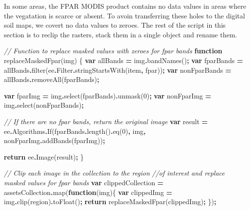 \documentclass[
  10pt,
  b5paper,
  oneside]{book}
\newenvironment{Shaded}{\begin{snugshade}}{\end{snugshade}}
\newcommand{\AttributeTok}[1]{\textcolor[rgb]{0.77,0.63,0.00}{#1}}
\newcommand{\CommentTok}[1]{\textcolor[rgb]{0.56,0.35,0.01}{\textit{#1}}}
\newcommand{\ControlFlowTok}[1]{\textcolor[rgb]{0.13,0.29,0.53}{\textbf{#1}}}
\newcommand{\DecValTok}[1]{\textcolor[rgb]{0.00,0.00,0.81}{#1}}
\newcommand{\FunctionTok}[1]{\textcolor[rgb]{0.00,0.00,0.00}{#1}}
\newcommand{\KeywordTok}[1]{\textcolor[rgb]{0.13,0.29,0.53}{\textbf{#1}}}
\newcommand{\NormalTok}[1]{#1}
\newcommand{\OperatorTok}[1]{\textcolor[rgb]{0.81,0.36,0.00}{\textbf{#1}}}
\newcommand{\StringTok}[1]{\textcolor[rgb]{0.31,0.60,0.02}{#1}}
\begin{document}
In some areas, the FPAR MODIS product contains no data values in areas where the vegatation is scarce or absent. To avoin transferring these holes to the digital soil maps, we covert no data values to zeroes.
The rest of the script in this section is to reclip the rasters, stack them in a single object and rename them.

\begin{Shaded}
\begin{Highlighting}[]
\CommentTok{// Function to replace masked values with zeroes for fpar bands}
\KeywordTok{function} \FunctionTok{replaceMaskedFpar}\NormalTok{(img) \{}
  \KeywordTok{var}\NormalTok{ allBands }\OperatorTok{=}\NormalTok{ img}\OperatorTok{.}\FunctionTok{bandNames}\NormalTok{()}\OperatorTok{;}
  \KeywordTok{var}\NormalTok{ fparBands }\OperatorTok{=} 
\NormalTok{  allBands}\OperatorTok{.}\FunctionTok{filter}\NormalTok{(ee}\OperatorTok{.}\AttributeTok{Filter}\OperatorTok{.}\FunctionTok{stringStartsWith}\NormalTok{(}\StringTok{\textquotesingle{}item\textquotesingle{}}\OperatorTok{,} \StringTok{\textquotesingle{}fpar\textquotesingle{}}\NormalTok{))}\OperatorTok{;}
  \KeywordTok{var}\NormalTok{ nonFparBands }\OperatorTok{=}\NormalTok{ allBands}\OperatorTok{.}\FunctionTok{removeAll}\NormalTok{(fparBands)}\OperatorTok{;}
  
  \KeywordTok{var}\NormalTok{ fparImg }\OperatorTok{=}\NormalTok{ img}\OperatorTok{.}\FunctionTok{select}\NormalTok{(fparBands)}\OperatorTok{.}\FunctionTok{unmask}\NormalTok{(}\DecValTok{0}\NormalTok{)}\OperatorTok{;}
  \KeywordTok{var}\NormalTok{ nonFparImg }\OperatorTok{=}\NormalTok{ img}\OperatorTok{.}\FunctionTok{select}\NormalTok{(nonFparBands)}\OperatorTok{;}
  
  \CommentTok{// If there are no fpar bands, return the original image}
  \KeywordTok{var}\NormalTok{ result }\OperatorTok{=}\NormalTok{ ee}\OperatorTok{.}\AttributeTok{Algorithms}\OperatorTok{.}\FunctionTok{If}\NormalTok{(fparBands}\OperatorTok{.}\FunctionTok{length}\NormalTok{()}\OperatorTok{.}\FunctionTok{eq}\NormalTok{(}\DecValTok{0}\NormalTok{)}\OperatorTok{,}
\NormalTok{                                 img}\OperatorTok{,}
\NormalTok{                                 nonFparImg}\OperatorTok{.}\FunctionTok{addBands}\NormalTok{(fparImg))}\OperatorTok{;}
  
  \ControlFlowTok{return}\NormalTok{ ee}\OperatorTok{.}\FunctionTok{Image}\NormalTok{(result)}\OperatorTok{;}
\NormalTok{\}}

\CommentTok{// Clip each image in the collection to the region }
\CommentTok{//of interest and replace masked values for fpar bands}
\KeywordTok{var}\NormalTok{ clippedCollection }\OperatorTok{=}\NormalTok{ assetsCollection}\OperatorTok{.}\FunctionTok{map}\NormalTok{(}\KeywordTok{function}\NormalTok{(img)\{}
  \KeywordTok{var}\NormalTok{ clippedImg }\OperatorTok{=}\NormalTok{ img}\OperatorTok{.}\FunctionTok{clip}\NormalTok{(region)}\OperatorTok{.}\FunctionTok{toFloat}\NormalTok{()}\OperatorTok{;}
  \ControlFlowTok{return} \FunctionTok{replaceMaskedFpar}\NormalTok{(clippedImg)}\OperatorTok{;}
\NormalTok{\})}\OperatorTok{;}


\end{Highlighting}
\end{Shaded}
\end{document}
